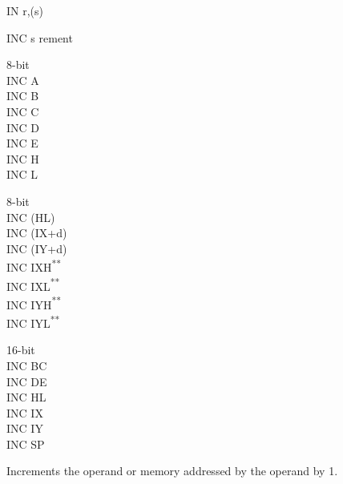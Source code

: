 \documentclass[12pt,twoside,openright,a4paper]{book}
\newcommand{\UNDOC}{\textnormal{\textsuperscript{**}}}
\begin{document}
\begin{basedescript}{
	\desclabelstyle{\multilinelabel}
	\desclabelwidth{3cm}}
\begin{DetailItem}{IN r,(s)}
		\begin{DetailTiming}
		\end{DetailTiming}



	\end{DetailItem}

	\pagebreak
	\begin{DetailItem}{INC s}
		{rement}
		{}

		\begin{DetailVariants}
			\textnormal{8-bit}\\
			INC A\\
			INC B\\
			INC C\\
			INC D\\
			INC E\\
			INC H\\
			INC L

			\textnormal{8-bit}\\
			INC (HL)\\
			INC (IX+d)\\
			INC (IY+d)\\
			INC IXH\UNDOC\\
			INC IXL\UNDOC\\
			INC IYH\UNDOC\\
			INC IYL\UNDOC

			\textnormal{16-bit}\\
			INC BC\\
			INC DE\\
			INC HL\\
			INC IX\\
			INC IY\\
			INC SP
		\end{DetailVariants}

		Increments the operand or memory addressed by the operand by 1.

		\begin{DetailEffects}[v]
			\FlagsINCr[8-bit]
		\end{DetailEffects}
				

\end{DetailItem}
\end{basedescript}
\end{document}
